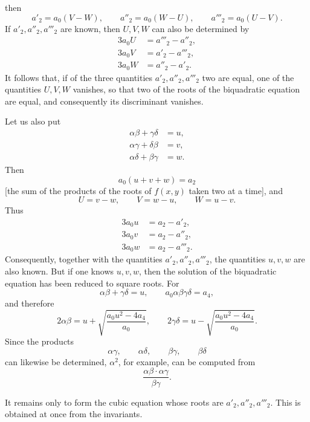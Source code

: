 \documentclass[11pt]{article}
\begin{document}
then
\begin{equation}
 a'_2=a_0(V-W),
 \qquad a''_2=a_0(W-U),
 \qquad a'''_2=a_0(U-V).
\tag{7}
\end{equation}
If $a'_2,a''_2,a'''_2$ are known, then $U,V,W$ can also be determined by
\begin{equation}
\begin{aligned}
 3a_0U&=a'''_2-a''_2,\\
 3a_0V&=a'_2-a'''_2,\\
 3a_0W&=a''_2-a'_2.
\end{aligned}
\tag{8}
\end{equation}
It follows that, if of the three quantities $a'_2,a''_2,a'''_2$ two are equal, one of the quantities $U,V,W$ vanishes, so that two of the roots of the biquadratic equation are equal, and consequently its discriminant vanishes.

Let us also put
\begin{equation}
\begin{aligned}
 \alpha\beta+\gamma\delta&=u,\\
 \alpha\gamma+\delta\beta&=v,\\
 \alpha\delta+\beta\gamma&=w.
\end{aligned}
\tag{9}
\end{equation}
Then
\[
 a_0(u+v+w)=a_2
\]
[the sum of the products of the roots of $f(x,y)$ taken two at a time], and
\[
 U=v-w,
 \qquad V=w-u,
 \qquad W=u-v.
\]
Thus
\begin{equation}
\begin{aligned}
 3a_0u&=a_2-a'_2,\\
 3a_0v&=a_2-a''_2,\\
 3a_0w&=a_2-a'''_2.
\end{aligned}
\tag{10}
\end{equation}
Consequently, together with the quantities $a'_2,a''_2,a'''_2$, the quantities $u,v,w$ are also known. But if one knows $u,v,w$, then the solution of the biquadratic equation has been reduced to square roots. For
\[
 \alpha\beta+\gamma\delta=u,
 \qquad a_0\alpha\beta\gamma\delta=a_4,
\]
and therefore
\[
 2\alpha\beta=u+\sqrt{\frac{a_0u^2-4a_4}{a_0}},
 \qquad
 2\gamma\delta=u-\sqrt{\frac{a_0u^2-4a_4}{a_0}}.
\]
Since the products
\[
 \alpha\gamma,
 \qquad \alpha\delta,
 \qquad \beta\gamma,
 \qquad \beta\delta
\]
can likewise be determined, $\alpha^2$, for example, can be computed from
\[
 \frac{\alpha\beta\cdot\alpha\gamma}{\beta\gamma}.
\]

It remains only to form the cubic equation whose roots are $a'_2,a''_2,a'''_2$. This is obtained at once from the invariants.
\end{document}
